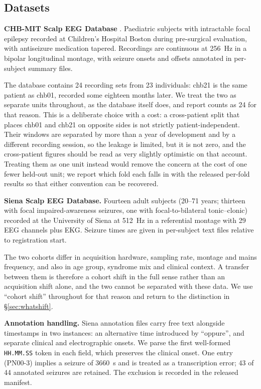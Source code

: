 \documentclass[11pt,a4paper]{article}
\begin{document}
\subsection{Datasets}

\textbf{CHB-MIT Scalp EEG Database} \citep{shoeb2009}. Paediatric subjects
with intractable focal epilepsy recorded at Children's Hospital Boston during
pre-surgical evaluation, with antiseizure medication tapered. Recordings are
continuous at \SI{256}{\hertz} in a bipolar longitudinal montage, with seizure
onsets and offsets annotated in per-subject summary files.

The database contains 24 recording sets from 23 individuals: chb21 is the
same patient as chb01, recorded some eighteen months later. We treat the two
as separate units throughout, as the database itself does, and report counts
as 24 for that reason. This is a deliberate choice with a cost: a
cross-patient split that places chb01 and chb21 on opposite sides is not
strictly patient-independent. Their windows are separated by more than a
year of development and by a different recording session, so the leakage is
limited, but it is not zero, and the cross-patient figures should be read as
very slightly optimistic on that account. Treating them as one unit instead
would remove the concern at the cost of one fewer held-out unit; we report
which fold each falls in with the released per-fold results so that either
convention can be recovered.

\textbf{Siena Scalp EEG Database.} Fourteen adult subjects (20--71 years;
thirteen with focal impaired-awareness seizures, one with focal-to-bilateral
tonic--clonic) recorded at the University of Siena at \SI{512}{\hertz} in a
referential montage with 29 EEG channels plus EKG. Seizure times are given in
per-subject text files relative to registration start.

The two cohorts differ in acquisition hardware, sampling rate, montage and
mains frequency, and also in age group, syndrome mix and clinical context. A
transfer between them is therefore a cohort shift in the full sense rather
than an acquisition shift alone, and the two cannot be separated with these
data. We use ``cohort shift'' throughout for that reason and return to the
distinction in \S\ref{sec:whatshift}.

\textbf{Annotation handling.} Siena annotation files carry free text alongside
timestamps in two instances: an alternative time introduced by ``oppure'', and
separate clinical and electrographic onsets. We parse the first well-formed
\texttt{HH.MM.SS} token in each field, which preserves the clinical onset. One
entry (PN00-3) implies a seizure of \SI{3660}{\second} and is treated as a
transcription error; 43 of 44 annotated seizures are retained. The exclusion
is recorded in the released manifest.
\end{document}
